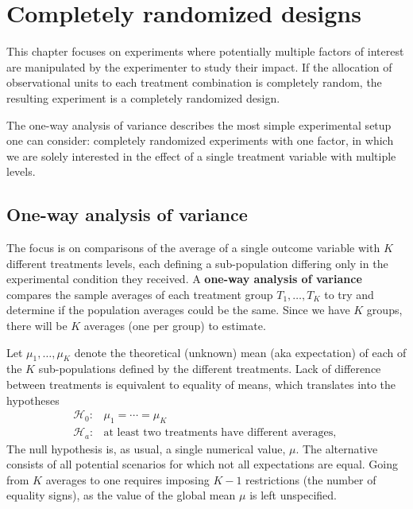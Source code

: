 \documentclass[
  11pt,
  letterpaper,
]{scrbook}
\theoremstyle{definition}
\theoremstyle{definition}
\theoremstyle{remark}
\begin{document}

\chapter{Completely randomized designs}\label{CRT}

This chapter focuses on experiments where potentially multiple factors
of interest are manipulated by the experimenter to study their impact.
If the allocation of observational units to each treatment combination
is completely random, the resulting experiment is a completely
randomized design.

The one-way analysis of variance describes the most simple experimental
setup one can consider: completely randomized experiments with one
factor, in which we are solely interested in the effect of a single
treatment variable with multiple levels.

\section{One-way analysis of
variance}\label{one-way-analysis-of-variance}

The focus is on comparisons of the average of a single outcome variable
with \(K\) different treatments levels, each defining a sub-population
differing only in the experimental condition they received. A
\textbf{one-way analysis of variance} compares the sample averages of
each treatment group \(T_1, \ldots, T_K\) to try and determine if the
population averages could be the same. Since we have \(K\) groups, there
will be \(K\) averages (one per group) to estimate.

Let \(\mu_1, \ldots, \mu_K\) denote the theoretical (unknown) mean (aka
expectation) of each of the \(K\) sub-populations defined by the
different treatments. Lack of difference between treatments is
equivalent to equality of means, which translates into the hypotheses
\begin{align*}
\mathscr{H}_0: & \mu_1 = \cdots = \mu_K \\
\mathscr{H}_a: & \text{at least two treatments have different averages, }
\end{align*} The null hypothesis is, as usual, a single numerical value,
\(\mu\). The alternative consists of all potential scenarios for which
not all expectations are equal. Going from \(K\) averages to one
requires imposing \(K-1\) restrictions (the number of equality signs),
as the value of the global mean \(\mu\) is left unspecified.
\end{document}
